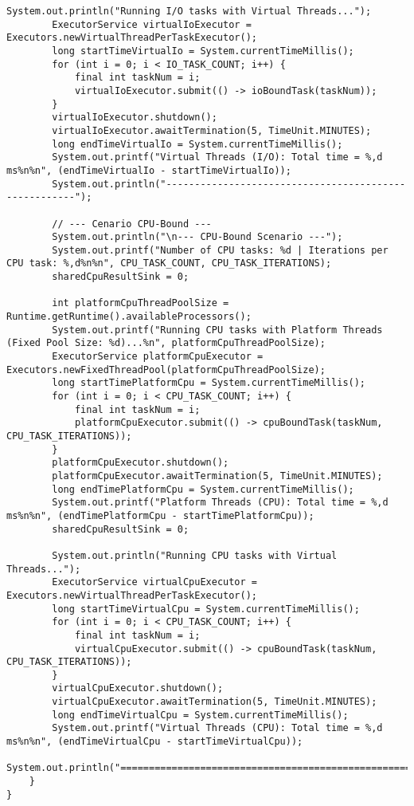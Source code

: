\documentclass[12pt,a4paper]{article}
\begin{document}
\begin{lstlisting}[caption=Código Java do Experimento (ThreadComparisonDemo.java), label=lst:code]
        System.out.println("Running I/O tasks with Virtual Threads...");
        ExecutorService virtualIoExecutor = Executors.newVirtualThreadPerTaskExecutor();
        long startTimeVirtualIo = System.currentTimeMillis();
        for (int i = 0; i < IO_TASK_COUNT; i++) {
            final int taskNum = i;
            virtualIoExecutor.submit(() -> ioBoundTask(taskNum));
        }
        virtualIoExecutor.shutdown();
        virtualIoExecutor.awaitTermination(5, TimeUnit.MINUTES);
        long endTimeVirtualIo = System.currentTimeMillis();
        System.out.printf("Virtual Threads (I/O): Total time = %,d ms%n%n", (endTimeVirtualIo - startTimeVirtualIo));
        System.out.println("------------------------------------------------------");

        // --- Cenario CPU-Bound ---
        System.out.println("\n--- CPU-Bound Scenario ---");
        System.out.printf("Number of CPU tasks: %d | Iterations per CPU task: %,d%n%n", CPU_TASK_COUNT, CPU_TASK_ITERATIONS);
        sharedCpuResultSink = 0;

        int platformCpuThreadPoolSize = Runtime.getRuntime().availableProcessors();
        System.out.printf("Running CPU tasks with Platform Threads (Fixed Pool Size: %d)...%n", platformCpuThreadPoolSize);
        ExecutorService platformCpuExecutor = Executors.newFixedThreadPool(platformCpuThreadPoolSize);
        long startTimePlatformCpu = System.currentTimeMillis();
        for (int i = 0; i < CPU_TASK_COUNT; i++) {
            final int taskNum = i;
            platformCpuExecutor.submit(() -> cpuBoundTask(taskNum, CPU_TASK_ITERATIONS));
        }
        platformCpuExecutor.shutdown();
        platformCpuExecutor.awaitTermination(5, TimeUnit.MINUTES);
        long endTimePlatformCpu = System.currentTimeMillis();
        System.out.printf("Platform Threads (CPU): Total time = %,d ms%n%n", (endTimePlatformCpu - startTimePlatformCpu));
        sharedCpuResultSink = 0;

        System.out.println("Running CPU tasks with Virtual Threads...");
        ExecutorService virtualCpuExecutor = Executors.newVirtualThreadPerTaskExecutor();
        long startTimeVirtualCpu = System.currentTimeMillis();
        for (int i = 0; i < CPU_TASK_COUNT; i++) {
            final int taskNum = i;
            virtualCpuExecutor.submit(() -> cpuBoundTask(taskNum, CPU_TASK_ITERATIONS));
        }
        virtualCpuExecutor.shutdown();
        virtualCpuExecutor.awaitTermination(5, TimeUnit.MINUTES);
        long endTimeVirtualCpu = System.currentTimeMillis();
        System.out.printf("Virtual Threads (CPU): Total time = %,d ms%n%n", (endTimeVirtualCpu - startTimeVirtualCpu));
        System.out.println("======================================================");
    }
}
\end{lstlisting}
\end{document}
